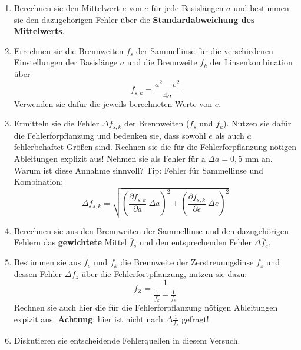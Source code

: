 \begin{enumerate}
%
\item Berechnen sie den Mittelwert $\overline{e}$ von $e$ für jede Basislängen $a$ und bestimmen sie den dazugehörigen Fehler über die \textbf{Standardabweichung des Mittelwerts}.
%
\item Errechnen sie die Brennweiten $f_s$ der Sammellinse für die verschiedenen Einstellungen der Basislänge $a$ und die Brennweite $f_k$ der Linsenkombination über 
\begin{equation*}
f_{s,k} = \frac{a^2-e^2}{4 a}
\end{equation*}
Verwenden sie dafür die jeweils berechneten Werte von $\overline{e}$.
%
\item Ermitteln sie die Fehler $\Delta f_{s,k}$ der Brennweiten ($f_s$ und $f_k$). Nutzen sie dafür die Fehlerforpflanzung und bedenken sie, dass sowohl $\overline{e}$ als auch $a$ fehlerbehaftet Größen sind. Rechnen sie die für die Fehlerforpflanzung nötigen Ableitungen explizit aus! Nehmen sie als Fehler für a $\Delta a = 0,5$ mm an. Warum ist diese Annahme sinnvoll?
Tip: Fehler für Sammellinse und Kombination:
\begin{equation*}\Delta f_{s,k}=\sqrt{\left(\frac{\partial f_{s,k}}{\partial a} ~ \Delta a\right)^2 + \left(\frac{\partial f_{s,k}}{\partial e} ~ \Delta e\right)^2}
\end{equation*}
%
\item Berechnen sie aus den Brennweiten der Sammellinse und den dazugehörigen Fehlern das \textbf{gewichtete} Mittel $\overline{f}_s$ und den entsprechenden Fehler $\Delta \overline{f}_s$.
%
\item Bestimmen sie aus $\overline{f}_s$ und $f_k$ die Brennweite der Zerstreuungslinse $f_z$ und dessen Fehler $\Delta f_z$ über die Fehlerfortpflanzung, nutzen sie dazu:
\begin{equation*}
f_Z = \frac{1}{\frac{1}{f_k} - \frac{1}{f_s}}
\end{equation*}
Rechnen sie auch hier die für die Fehlerforpflanzung nötigen Ableitungen expizit aus.
\textbf{Achtung}: hier ist nicht nach $\Delta \frac{1}{f_z}$ gefragt!
%
\item Diskutieren sie entscheidende Fehlerquellen in diesem Versuch.
%
\end{enumerate}